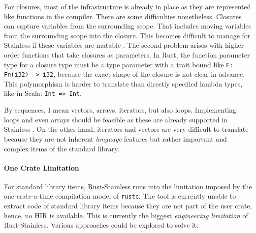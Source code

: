 For closures, most of the infrastructure is already in place as they are
represented like functions in the compiler. There are some difficulties
nonetheless. Closures can capture variables from the surrounding scope. That
includes moving variables from the surrounding scope into the closure. This
becomes difficult to manage for Stainless if these variables are mutable
\cite[section 3.4.3]{regb}. The second problem arises with higher-order
functions that take closures as parameters. In Rust, the function parameter type
for a closure type must be a type parameter with a trait bound like
\passthrough{\lstinline!F: Fn(i32) -> i32!}, because the exact shape of the
closure is not clear in advance. This polymorphism is harder to translate than
directly specified lambda types, like in Scala: \passthrough{\lstinline!Int =>
Int!}.

By sequences, I mean vectors, arrays, iterators, but also loops. Implementing
loops and even arrays should be feasible as these are already supported in
Stainless \cite[section ``Imperative'']{stainless-doc}. On the other hand,
iterators and vectors are very difficult to translate because they are not
inherent \emph{language} features but rather important and complex items of the
standard library.


\paragraph{One Crate Limitation}

For standard library items, Rust-Stainless runs into the limitation imposed by
the one-crate-a-time compilation model of \lstinline!rustc!. The tool is
currently unable to extract code of standard library items because they are not
part of the user crate, hence, no HIR is available. This is currently the
biggest \emph{engineering limitation} of Rust-Stainless. Various approaches
could be explored to solve it:

